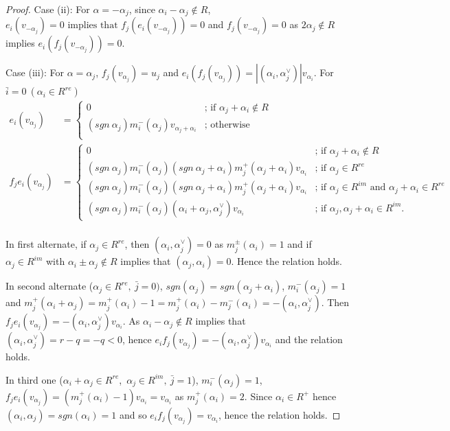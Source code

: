 \documentclass[11pt]{amsart}
\theoremstyle{plain}
\theoremstyle{definition}
\numberwithin{equation}{section}
\newcommand{\al}{\alpha}
\begin{document}
\begin{proof}
		Case (ii): For $\alpha=-\alpha_j$, since $\alpha_i-\alpha_j\notin R$, $e_i(v_{-\alpha_j})=0\text{ implies that } f_j(e_i(v_{-\alpha_j}))=0$ and $f_j(v_{-\alpha_j})=0$ as $2\al_j\notin R$ implies $e_i(f_j(v_{-\alpha_j}))=0$.
		
		Case (iii): For $\alpha=\alpha_j$, $f_j(v_{\alpha_j})=u_j$ and $e_i(f_j(v_{\alpha_j}))=|(\alpha_i,\alpha_j^{\vee})|v_{\alpha_i}$. For $\bar{i}=0~(\al_i\in R^{re})$
		\begin{align*}
			e_i(v_{\alpha_j})&=\begin{cases}
				0&\text{; if }\al_j+\al_i\notin R\\
				(sgn~\al_j)m_i^-(\alpha_j)v_{\al_j+\alpha_i}& \text{; otherwise }\\
			\end{cases}\\
			f_je_i(v_{\alpha_j})&=\begin{cases}
				0&\text{; if }\al_j+\al_i\notin R\\
				(sgn~\al_j)m_i^-(\alpha_j)(sgn~\al_j+\al_i)m_j^+(\al_j+\al_i)v_{\alpha_i}& \text{; if }\al_j\in R^{re}\\
				(sgn~\al_j)m_i^-(\al_j)(sgn~\al_j+\al_i)m_j^+(\al_j+\al_i)v_{\al_i}&\text{; if }\al_j\in R^{im}\text{ and }\al_j+\al_i\in R^{re}\\
				(sgn~\al_j)m_i^-(\al_j)(\al_i+\al_j,\al_j^{\vee})v_{\al_i}&\text{; if }\al_j,\al_j+\al_i\in R^{im}.
			\end{cases}\\
		\end{align*}
		
		In first alternate, if $\al_j\in R^{re}$, then $(\al_i,\al_j^{\vee})=0$ as $m_j^{\pm}(\al_i)=1$ and if $\al_j\in R^{im}$ with $\al_i\pm\al_j\notin R$ implies that $(\al_j,\al_i)=0$. Hence the relation holds.
		
		In second alternate ($\al_j\in R^{re},~\bar j=0)$, $sgn(\al_j)=sgn(\al_j+\al_i)$, $m_i^-(\al_j)=1$ and $m_j^+(\al_i+\al_j)=m_j^+(\al_i)-1=m_j^+(\al_i)-m_j^-(\al_i)=-(\al_i,\al_j^{\vee})$. Then $f_je_i(v_{\al_j})=-(\al_i,\al_j^{\vee})v_{\al_i}$. As $\al_i-\al_j\notin R$ implies that $(\al_i,\al_j^{\vee})=r-q=-q<0$, hence $e_if_j(v_{\al_j})=-(\al_i,\al_j^{\vee})v_{\al_i}$ and the relation holds. 
		
		In third one ($\al_i+\al_j\in R^{re}$,~$\al_j\in R^{im},~\bar j=1$), $m_i^-(\al_j)=1$, $f_je_i(v_{\al_j})=(m_j^+(\al_i)-1)v_{\al_i}=v_{\al_i}$ as $m_j^+(\al_i)=2$. Since $\al_i\in R^+$ hence $(\al_i,\al_j)=sgn(\al_i)=1$ and so $e_if_j(v_{\al_j})=v_{\al_i}$, hence the relation holds.		
		

\end{proof}
\end{document}
